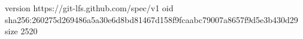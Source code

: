 version https://git-lfs.github.com/spec/v1
oid sha256:260275d269486a5a30e6d8bd81467d158f9fcaabc79007a8657f9d5e3b430d29
size 2520
